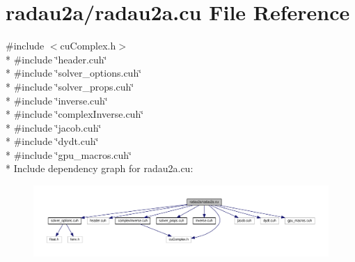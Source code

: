 \hypertarget{radau2a_8cu}{}\section{radau2a/radau2a.cu File Reference}
\label{radau2a_8cu}
{\ttfamily \#include $<$cu\+Complex.\+h$>$}\\*
{\ttfamily \#include \char`\"{}header.\+cuh\char`\"{}}\\*
{\ttfamily \#include \char`\"{}solver\+\_\+options.\+cuh\char`\"{}}\\*
{\ttfamily \#include \char`\"{}solver\+\_\+props.\+cuh\char`\"{}}\\*
{\ttfamily \#include \char`\"{}inverse.\+cuh\char`\"{}}\\*
{\ttfamily \#include \char`\"{}complex\+Inverse.\+cuh\char`\"{}}\\*
{\ttfamily \#include \char`\"{}jacob.\+cuh\char`\"{}}\\*
{\ttfamily \#include \char`\"{}dydt.\+cuh\char`\"{}}\\*
{\ttfamily \#include \char`\"{}gpu\+\_\+macros.\+cuh\char`\"{}}\\*
Include dependency graph for radau2a.\+cu\+:\nopagebreak
\begin{figure}[H]
\begin{center}
\leavevmode
\includegraphics[width=350pt]{radau2a_8cu__incl}
\end{center}
\end{figure}

